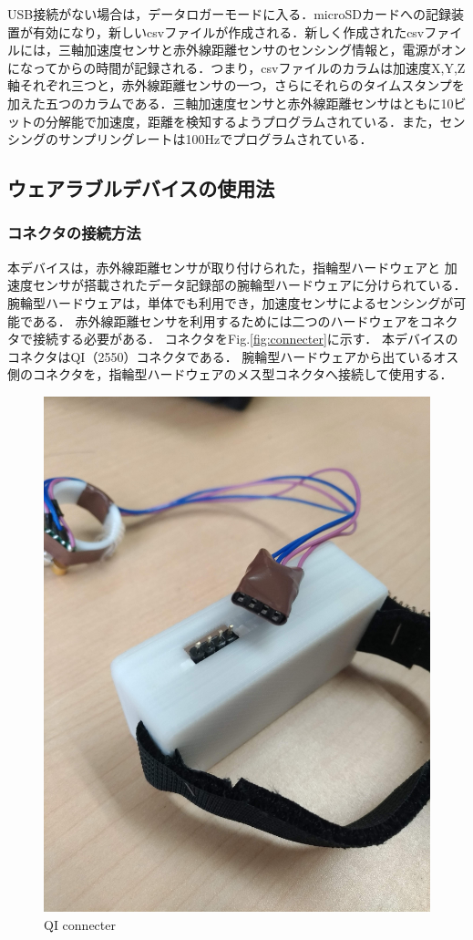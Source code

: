 USB接続がない場合は，データロガーモードに入る．microSDカードへの記録装置が有効になり，新しいcsvファイルが作成される．新しく作成されたcsvファイルには，三軸加速度センサと赤外線距離センサのセンシング情報と，電源がオンになってからの時間が記録される．つまり，csvファイルのカラムは加速度X,Y,Z軸それぞれ三つと，赤外線距離センサの一つ，さらにそれらのタイムスタンプを加えた五つのカラムである．三軸加速度センサと赤外線距離センサはともに10ビットの分解能で加速度，距離を検知するようプログラムされている．また，センシングのサンプリングレートは100Hzでプログラムされている．

\subsection{ウェアラブルデバイスの使用法}
\subsubsection*{コネクタの接続方法}
本デバイスは，赤外線距離センサが取り付けられた，指輪型ハードウェアと
加速度センサが搭載されたデータ記録部の腕輪型ハードウェアに分けられている．
腕輪型ハードウェアは，単体でも利用でき，加速度センサによるセンシングが可能である．
赤外線距離センサを利用するためには二つのハードウェアをコネクタで接続する必要がある．
コネクタをFig.\ref{fig:connecter}に示す．
本デバイスのコネクタはQI（2550）コネクタである．
腕輪型ハードウェアから出ているオス側のコネクタを，指輪型ハードウェアのメス型コネクタへ接続して使用する．
\begin{figure}[H]
  \centering
  \includegraphics[width=0.3\linewidth]{fig/connecter.jpg}
  \caption{QI connecter}
  \label{fig:QI connecter}
\end{figure}


